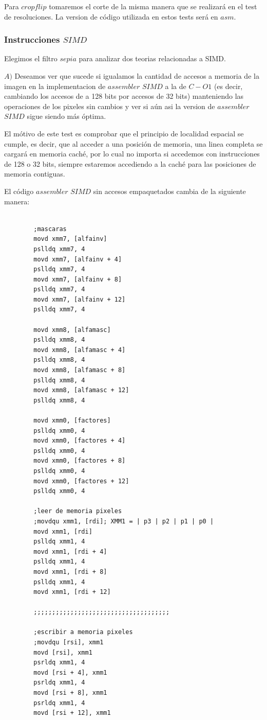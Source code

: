 Para $cropflip$ tomaremos el corte de la misma manera que se realizará en el test de resoluciones.
La version de código utilizada en estos tests será en $asm$.

\subsubsection{Instrucciones $SIMD$}

Elegimos el filtro $sepia$ para analizar dos teorias relacionadas a SIMD. 

$A)$ Deseamos ver que sucede si igualamos la cantidad de accesos a memoria de la imagen en la implementacion de $assembler$ $SIMD$ a la de $C-O1$ (es decir, cambiando los accesos de a 128 bits por accesos de 32 bits) manteniendo las operaciones de los pixeles sin cambios  y ver si aún asi la version de $assembler$ $SIMD$ sigue siendo más óptima.

El mótivo de este test es comprobar que el principio de localidad espacial se cumple, es decir, que al acceder a una posición de memoria, una linea completa se cargará en memoria caché, por lo cual no importa si accedemos con instrucciones de 128 o 32 bits, siempre estaremos accediendo a la caché para las posiciones de memoria contiguas.

El código $assembler$ $SIMD$ sin accesos empaquetados cambia de la siguiente manera:

\begin{codesnippet}
\begin{verbatim}

		;mascaras
		movd xmm7, [alfainv]
 	    pslldq xmm7, 4
	    movd xmm7, [alfainv + 4]
	    pslldq xmm7, 4
	    movd xmm7, [alfainv + 8]
	    pslldq xmm7, 4
	    movd xmm7, [alfainv + 12]
	    pslldq xmm7, 4

	    movd xmm8, [alfamasc]
	    pslldq xmm8, 4
	    movd xmm8, [alfamasc + 4]
	    pslldq xmm8, 4
	    movd xmm8, [alfamasc + 8]
	    pslldq xmm8, 4
	    movd xmm8, [alfamasc + 12]
	    pslldq xmm8, 4

	    movd xmm0, [factores]
	    pslldq xmm0, 4
	    movd xmm0, [factores + 4]
	    pslldq xmm0, 4
	    movd xmm0, [factores + 8]
	    pslldq xmm0, 4
	    movd xmm0, [factores + 12]
	    pslldq xmm0, 4

		;leer de memoria pixeles
		;movdqu xmm1, [rdi]; XMM1 = | p3 | p2 | p1 | p0 |
		movd xmm1, [rdi]
		pslldq xmm1, 4
		movd xmm1, [rdi + 4]
		pslldq xmm1, 4
		movd xmm1, [rdi + 8]
		pslldq xmm1, 4
		movd xmm1, [rdi + 12]	
		
		;;;;;;;;;;;;;;;;;;;;;;;;;;;;;;;;;;;;;
		
		;escribir a memoria pixeles
		;movdqu [rsi], xmm1
		movd [rsi], xmm1
		psrldq xmm1, 4
		movd [rsi + 4], xmm1
		psrldq xmm1, 4
		movd [rsi + 8], xmm1
		psrldq xmm1, 4
		movd [rsi + 12], xmm1

\end{verbatim}
\end{codesnippet}

